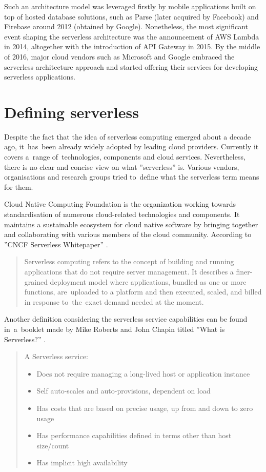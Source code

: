 Such an architecture model was leveraged firstly by mobile applications built on top of hosted database solutions, such as Parse (later acquired by Facebook) and Firebase around 2012 (obtained by Google). Nonetheless, the most significant event shaping the serverless architecture was the announcement of AWS Lambda in 2014, altogether with the introduction of API Gateway in 2015. By the middle of 2016, major cloud vendors such as Microsoft and Google embraced the serverless architecture approach and started offering their services for developing serverless applications.

\section{Defining serverless} \label{section:serverless-definition}

Despite the fact that the idea of serverless computing emerged about a decade ago, it~has~been already widely adopted by leading cloud providers. Currently it covers a~range of~technologies, components and cloud services. Nevertheless, there is no clear and concise view on what ''serverless'' is. Various vendors, organisations and research groups tried to~define what the serverless term means for them.

Cloud Native Computing Foundation is the organization working towards standardisation of numerous cloud-related technologies and components. It maintains a sustainable ecosystem for cloud native software by bringing together and collaborating with various members of the cloud community. According to ''CNCF Serverless Whitepaper'' \cite{CNCFServerless}.

\begin{quotation}
Serverless computing refers to the concept of building and running applications that do not require server management. It describes a finer-grained deployment model where applications, bundled as one or more functions, are~uploaded to a platform and then executed, scaled, and billed in response to~the~exact demand needed at the moment.
\end{quotation}

Another definition considering the serverless service capabilities can be found in~a~booklet made by Mike Roberts and John Chapin titled ''What is Serverless?'' \cite{RobertsChapin2017}.

\begin{quotation}
\noindent A Serverless service:
\begin{itemize}
    \item Does not require managing a long-lived host or application instance
    \item Self auto-scales and auto-provisions, dependent on load
    \item Has costs that are based on precise usage, up from and down to zero usage
    \item Has performance capabilities defined in terms other than host size/count
    \item Has implicit high availability
\end{itemize}
\end{quotation}

